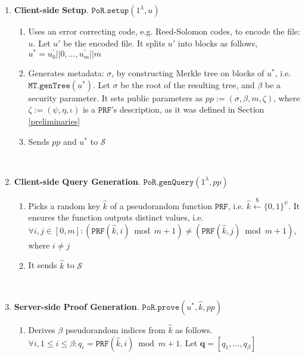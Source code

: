 \begin{enumerate}

\item\textbf{Client-side Setup}. $\mathtt{PoR.setup}(1^{\lambda},u)$  
\begin{enumerate}
\item Uses an error correcting code, e.g. Reed-Solomon codes, to encode  the file: $u$. Let $u'$ be the encoded file. It splits $u'$  into  blocks as follows, $u^{\scriptscriptstyle *}=u^{\scriptscriptstyle '}_{\scriptscriptstyle 0}||0,...,u^{\scriptscriptstyle '}_{\scriptscriptstyle m}||m$
\item Generates  metadata: $\sigma$, by constructing Merkle tree on blocks of $u^{\scriptscriptstyle *}$, i.e. $\mathtt{MT.genTree}(u^{\scriptscriptstyle *})$. Let $\sigma$ be the root of the resulting tree, and $\beta$ be a security parameter. It sets public  parameters as $pp:= (\sigma,\beta,m,\zeta)$, where $\zeta:=(\psi,\eta, \iota)$ is a $\mathtt{PRF}$'s description, as it was defined in Section \ref{preliminaries}
\item Sends $pp$ and $u^{\scriptscriptstyle *}$ to $\mathcal{S}$
\end{enumerate}

\

\item\textbf{Client-side Query Generation}. $\mathtt{PoR.genQuery}(1^{\scriptscriptstyle\lambda}, pp)$ 
\begin{enumerate}
\item\label{key-chalenge} Picks a random key $\hat{k}$ of a pseudorandom function $\mathtt{PRF}$, i.e. $\hat{k}\stackrel{\scriptscriptstyle\$}\leftarrow\{0,1\}^{\scriptscriptstyle\psi}$. It ensures the function outputs distinct values, i.e. $\forall i,j\in [0,m]: (\mathtt{PRF}(\hat{k},i)\bmod m+1)\neq(\mathtt{PRF}(\hat{k},j)\bmod m+1)$, where $i\neq j$

\item It sends $\hat{k}$ to $\mathcal{S}$
 
 \end{enumerate}
 
 \
 
\item\label{PoR-server-prove}\textbf{Server-side Proof Generation}. $\mathtt{PoR.prove}(u^{\scriptscriptstyle *},\hat{k},pp)$ 
 \begin{enumerate}
\item Derives $\beta$ pseudorandom indices from $\hat{k}$ as follows. $\forall i,1\leq i\leq \beta: q_{\scriptscriptstyle i}=\mathtt{PRF}(\hat{k},i)\bmod m+1$. Let ${\bm{q}}=[q_{\scriptscriptstyle 1},..., q_{\scriptscriptstyle \beta}]$


\end{enumerate}
\end{enumerate}
